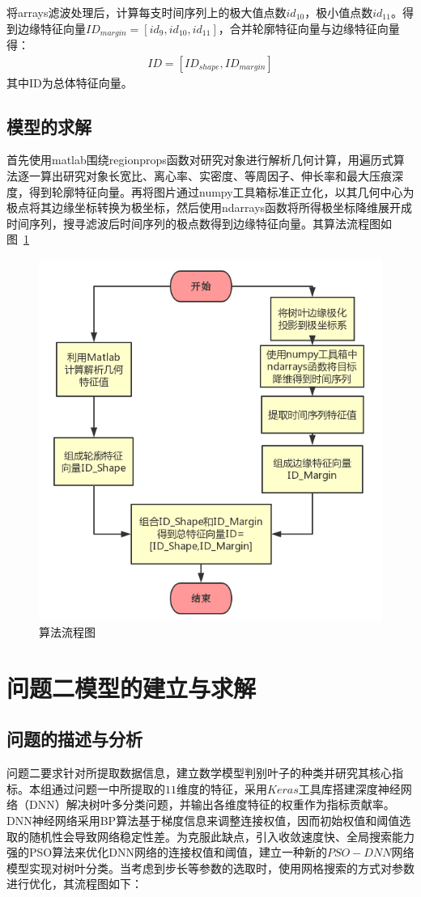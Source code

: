 \documentclass{whutmod}
\begin{document}
		将arrays滤波处理后，计算每支时间序列上的极大值点数$id_{10}$，极小值点数$id_{11}$。得到边缘特征向量$ID_{margin}=[id_{9},id_{10},id_{11}]$，合并轮廓特征向量与边缘特征向量得：
		\begin{gather}
		ID=[ID_{shape},ID_{margin}]
		\end{gather}
	     其中ID为总体特征向量。
	      \subsection{模型的求解}
	      首先使用matlab围绕regionprops函数对研究对象进行解析几何计算，用遍历式算法逐一算出研究对象长宽比、离心率、实密度、等周因子、伸长率和最大压痕深度，得到轮廓特征向量。再将图片通过numpy工具箱标准正立化，以其几何中心为极点将其边缘坐标转换为极坐标，然后使用ndarrays函数将所得极坐标降维展开成时间序列，搜寻滤波后时间序列的极点数得到边缘特征向量。其算法流程图如图~\ref{88}~
	      
	      \begin{figure}[H]
	      	\centering
	      	\includegraphics[width=.8\textwidth]{figures/lct.png}
	      	\caption{算法流程图}\label{88}
	      \end{figure}
	      	
	
	
	
	
	\section{问题二模型的建立与求解}
	\subsection{问题的描述与分析}
	问题二要求针对所提取数据信息，建立数学模型判别叶子的种类并研究其核心指标。本组通过问题一中所提取的$11$维度的特征，采用$Keras$工具库搭建深度神经网络（DNN）解决树叶多分类问题，并输出各维度特征的权重作为指标贡献率。DNN神经网络采用BP算法基于梯度信息来调整连接权值，因而初始权值和阈值选取的随机性会导致网络稳定性差。为克服此缺点，引入收敛速度快、全局搜索能力强的PSO算法来优化DNN网络的连接权值和阈值，建立一种新的$PSO-DNN$网络模型实现对树叶分类。当考虑到步长等参数的选取时，使用网格搜索的方式对参数进行优化，其流程图如下：
		
\end{document}
